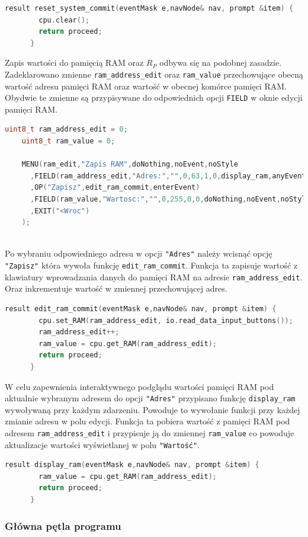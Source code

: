 \documentclass[../main.tex]{subfiles}
\begin{document}
\begin{lstlisting}[language=C++]
    result reset_system_commit(eventMask e,navNode& nav, prompt &item) {
        cpu.clear();
        return proceed;
      }
\end{lstlisting}

\par
Zapis wartości do pamięcią RAM oraz $R_P$ odbywa się na podobnej zasadzie. Zadeklarowano zmienne \texttt{ram\_address\_edit} oraz \texttt{ram\_value}
przechowujące obecną wartość adresu pamięci RAM oraz wartość w obecnej komórce pamięci RAM. Obydwie te zmienne są przypisywane
do odpowiednich opcji \texttt{FIELD} w oknie edycji pamięci RAM.

\begin{lstlisting}[language=C++]
    uint8_t ram_address_edit = 0;
    uint8_t ram_value = 0;
    
    MENU(ram_edit,"Zapis RAM",doNothing,noEvent,noStyle
      ,FIELD(ram_address_edit,"Adres:","",0,63,1,0,display_ram,anyEvent,wrapStyle)
      ,OP("Zapisz",edit_ram_commit,enterEvent)
      ,FIELD(ram_value,"Wartosc:","",0,255,0,0,doNothing,noEvent,noStyle)
      ,EXIT("<Wroc")
    );
    
\end{lstlisting}

Po wybraniu odpowiedniego adresu w opcji \texttt{"Adres"} należy wcisnąć opcję \texttt{"Zapisz"} która wywoła funkcję \texttt{edit\_ram\_commit}.
Funkcja ta zapisuje wartość z klawiatury wprowadzania danych do pamięci RAM na adresie \texttt{ram\_address\_edit}. Oraz inkrementuje wartość
w zmiennej przechowującej adres.

\begin{lstlisting}[language=C++]
    result edit_ram_commit(eventMask e,navNode& nav, prompt &item) {
        cpu.set_RAM(ram_address_edit, io.read_data_input_buttons());
        ram_address_edit++;
        ram_value = cpu.get_RAM(ram_address_edit);
        return proceed;
      }
\end{lstlisting}

W celu zapewnienia interaktywnego podglądu wartości pamięci RAM pod aktualnie wybranym adresem do opcji \texttt{"Adres"} przypisano 
funkcję \texttt{display\_ram} wywoływaną przy każdym zdarzeniu. Powoduje to wywołanie funkcji przy każdej zmianie adresu w polu edycji.
Funkcja ta pobiera wartość z pamięci RAM pod adresem \texttt{ram\_address\_edit} i przypisuje ją do zmiennej \texttt{ram\_value} 
co powoduje aktualizacje wartości wyświetlanej w polu \texttt{"Wartość"}.

\begin{lstlisting}[language=C++]
      result display_ram(eventMask e,navNode& nav, prompt &item) {
        ram_value = cpu.get_RAM(ram_address_edit);
        return proceed;
      }
\end{lstlisting}

\subsubsection{Główna pętla programu}
\end{document}
